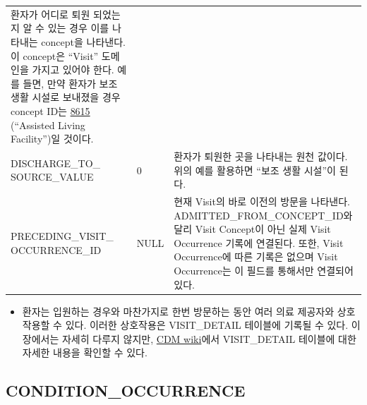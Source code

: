 \documentclass[10.5pt]{book}
\providecommand{\tightlist}{%
  \setlength{\itemsep}{0pt}\setlength{\parskip}{0pt}}
\theoremstyle{definition}
\theoremstyle{definition}
\theoremstyle{definition}
\theoremstyle{remark}
\begin{document}
\begin{longtable}[]{@{}lll@{}}
\begin{minipage}[t]{0.48\columnwidth}
환자가 어디로 퇴원 되었는지 알 수 있는 경우 이를 나타내는 concept을
나타낸다. 이 concept은 ``Visit'' 도메인을 가지고 있어야 한다. 예를 들면,
만약 환자가 보조 생활 시설로 보내졌을 경우 concept ID는
\href{http://athena.ohdsi.org/search-terms/terms/8615}{8615} (``Assisted
Living Facility'')일 것이다.\strut
\end{minipage}\tabularnewline
\begin{minipage}[t]{0.28\columnwidth}\raggedright\strut
DISCHARGE\_TO\_ SOURCE\_VALUE\strut
\end{minipage} & \begin{minipage}[t]{0.16\columnwidth}\raggedright\strut
0\strut
\end{minipage} & \begin{minipage}[t]{0.48\columnwidth}\raggedright\strut
환자가 퇴원한 곳을 나타내는 원천 값이다. 위의 예를 활용하면 ``보조 생활
시설''이 된다.\strut
\end{minipage}\tabularnewline
\begin{minipage}[t]{0.28\columnwidth}\raggedright\strut
PRECEDING\_VISIT\_ OCCURRENCE\_ID\strut
\end{minipage} & \begin{minipage}[t]{0.16\columnwidth}\raggedright\strut
NULL\strut
\end{minipage} & \begin{minipage}[t]{0.48\columnwidth}\raggedright\strut
현재 Visit의 바로 이전의 방문을 나타낸다. ADMITTED\_FROM\_CONCEPT\_ID와
달리 Visit Concept이 아닌 실제 Visit Occurrence 기록에 연결된다. 또한,
Visit Occurrence에 따른 기록은 없으며 Visit Occurrence는 이 필드를
통해서만 연결되어 있다.\strut
\end{minipage}\tabularnewline
\bottomrule
\end{longtable}

\begin{itemize}
\tightlist
\item
  환자는 입원하는 경우와 마찬가지로 한번 방문하는 동안 여러 의료
  제공자와 상호 작용할 수 있다. 이러한 상호작용은 VISIT\_DETAIL 테이블에
  기록될 수 있다. 이 장에서는 자세히 다루지 않지만,
  \href{https://github.com/OHDSI/CommonDataModel/wiki/VISIT_DETAIL}{CDM
  wiki}에서 VISIT\_DETAIL 테이블에 대한 자세한 내용을 확인할 수 있다.
\end{itemize}

\subsection{CONDITION\_OCCURRENCE}\label{conditionOccurrence}
\end{document}
